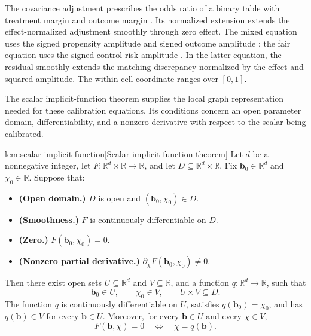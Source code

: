 \documentclass[11pt]{article}
\begin{document}
The covariance adjustment  prescribes the odds ratio of a binary table with treatment margin  and outcome margin . Its normalized extension  extends the effect-normalized adjustment smoothly through zero effect. The mixed equation uses the signed propensity amplitude  and signed outcome amplitude ; the fair equation uses the signed control-risk amplitude . In the latter equation, the residual  smoothly extends the matching discrepancy normalized by the effect and squared amplitude. The within-cell coordinate  ranges over \([0,1]\).

The scalar implicit-function theorem supplies the local graph representation needed for these calibration equations. Its conditions concern an open parameter domain, differentiability, and a nonzero derivative with respect to the scalar being calibrated.

\begin{lemmav}{lem:scalar-implicit-function}[Scalar implicit function theorem]
Let \(d\) be a nonnegative integer, let \(F:\mathbb R^d\times\mathbb R\to\mathbb R\), and let \(D\subseteq\mathbb R^d\times\mathbb R\). Fix \(\mathbf b_0\in\mathbb R^d\) and \(\chi_0\in\mathbb R\). Suppose that:
\begin{itemize}
\item \textbf{(Open domain.)} \(D\) is open and \((\mathbf b_0,\chi_0)\in D\).
\item \textbf{(Smoothness.)} \(F\) is continuously differentiable on \(D\).
\item \textbf{(Zero.)} \(F(\mathbf b_0,\chi_0)=0\).
\item \textbf{(Nonzero partial derivative.)} \(\partial_\chi F(\mathbf b_0,\chi_0)\ne0\).
\end{itemize}
Then there exist open sets \(U\subseteq\mathbb R^d\) and \(V\subseteq\mathbb R\), and a function \(q:\mathbb R^d\to\mathbb R\), such that
\[
\mathbf b_0\in U,\qquad \chi_0\in V,\qquad U\times V\subseteq D.
\]
The function \(q\) is continuously differentiable on \(U\), satisfies \(q(\mathbf b_0)=\chi_0\), and has \(q(\mathbf b)\in V\) for every \(\mathbf b\in U\). Moreover, for every \(\mathbf b\in U\) and every \(\chi\in V\),
\[
F(\mathbf b,\chi)=0
\quad\Longleftrightarrow\quad
\chi=q(\mathbf b).
\]
\end{lemmav}
\end{document}
